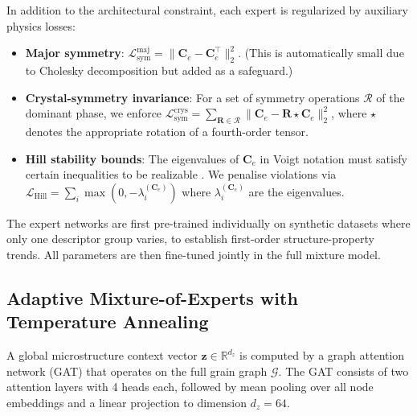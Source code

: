 \documentclass{article}
\begin{document}
In addition to the architectural constraint, each expert is regularized by auxiliary physics losses:
\begin{itemize}
    \item \textbf{Major symmetry}: \( \mathcal{L}_{\text{sym}}^{\mathrm{maj}} = \|\mathbf{C}_e - \mathbf{C}_e^{\!\top}\|_2^2 \). (This is automatically small due to Cholesky decomposition but added as a safeguard.)
    \item \textbf{Crystal-symmetry invariance}: For a set of symmetry operations \(\mathcal{R}\) of the dominant phase, we enforce \(\mathcal{L}_{\text{sym}}^{\mathrm{crys}} = \sum_{\mathbf{R}\in\mathcal{R}} \|\mathbf{C}_e - \mathbf{R}\star\mathbf{C}_e\|_2^2\), where \(\star\) denotes the appropriate rotation of a fourth-order tensor.
    \item \textbf{Hill stability bounds}: The eigenvalues of \(\mathbf{C}_e\) in Voigt notation must satisfy certain inequalities to be realizable \cite{hill1952elastic}. We penalise violations via \(\mathcal{L}_{\mathrm{Hill}} = \sum_i \max(0, -\lambda_i^{(\mathbf{C}_e)})\) where \(\lambda_i^{(\mathbf{C}_e)}\) are the eigenvalues.
\end{itemize}
The expert networks are first pre-trained individually on synthetic datasets where only one descriptor group varies, to establish first-order structure-property trends. All parameters are then fine-tuned jointly in the full mixture model.

\subsection{Adaptive Mixture-of-Experts with Temperature Annealing}
\label{sec:gating}

A global microstructure context vector \(\mathbf{z}\in\mathbb{R}^{d_z}\) is computed by a graph attention network (GAT) \cite{velickovic2018graph} that operates on the full grain graph \(\mathcal{G}\). The GAT consists of two attention layers with 4 heads each, followed by mean pooling over all node embeddings and a linear projection to dimension \(d_z = 64\).
\end{document}
